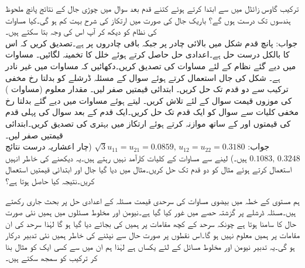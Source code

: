 \quad
ترکیب گاوس زائڈل میں  سے ابتدا کرتے ہوئے کتنے قدم بعد سوال  میں چوڑی جال کے نتائج پانچ ملحوظ ہندسوں تک درست ہوں گے؟ باریک جال کی صورت میں ارتکاز کی شرح بہت کم ہو گی۔کیا مساوات کی نظام کو دیکھ کر آپ اس کی وجہ بتا سکتے ہیں۔\\
جواب:\quad
پانچ قدم
شکل  میں بالائی چادر پر  جبکہ باقی چادروں پر  ہے۔تصدیق کریں کہ اس کا بالکل درست حل  ہے۔اعدادی حل حاصل کرتے ہوئے خلل کا تخمینہ لگائیں۔
\quad 
مساوات  میں دیے گئے نظام کے لئے مساوات  کی تصدیق کریں۔دکھائیں کہ مساوات  میں  غیر نادر ہے۔ 
\quad
شکل  کی جال استعمال کرتے ہوئے سوال  کے مسئلہ ڈرشلے  کو بدلتا رخ مخفی ترکیب سے دو قدم تک حل کریں۔  ابتدائی قیمتیں صفر لیں۔
\quad
مقدار معلوم  (مساوات ) کی موزوں قیمت  سوال  کے لئے تلاش کریں۔ لیتے ہوئے مساوات  میں دیے گئے بدلتا رخ مخفی کلیات سے سوال   کو ایک قدم تک حل کریں۔ایک قدم کے بعد سوال  کی پہلی قدم کی قیمتوں  اور  کے ساتھ موازنہ کرتے ہوئے ارتکاز میں بہتری کی تصدیق کریں۔ابتدائی قیمتیں صفر لیں۔\\
جواب:\quad
$\sqrt{3}u_{11}=u_{21}=0.0859,\, u_{12}=u_{22}=0.3180$
(چار اعشاریہ درست نتائج 
$0.1083,\,0.3248$
ہیں۔) 
\quad
{} لینے سے مساوات  کے کلیات کارآمد نہیں رہتے ہیں۔یہ دیکھنے کی خاطر انہیں استعمال کرتے ہوئے مثال  کو دو قدم تک حل کریں۔مثال میں دیا گیا جال اور ابتدائی قیمتیں استعمال کریں۔نتیجہ کیا حاصل ہوتا ہے؟

ہم  مستوی کے خطہ  میں بیضوی مساوات کی سرحدی قیمت مسئلہ کے اعدادی حل پر بحث جاری رکھتے ہیں۔مسئلہ ڈرشلے پر گزشتہ حصے میں غور کیا گیا ہے۔نیومن اور مخلوط مسئلوں میں ہمیں نئی صورت حال کا سامنا ہوتا ہے چونکہ سرحد کے کچھ مقامات پر ہمیں  کی بجائے   دیا گیا ہو گا لہٰذا سرحد کی ان مقامات پر ہمیں  معلوم نہیں ہو گا۔اس نقطوں پر صورت حال سے نپٹنے کی خاطر ہمیں نئی تدبیر درکار ہو گی۔یہ تدبیر نیومن اور مخلوط مسائل کے لئے یکساں ہے لہٰذا ہم ان میں سے کسی ایک کو مثال بنا کر ترکیب کو سمجھ سکتے ہیں۔


